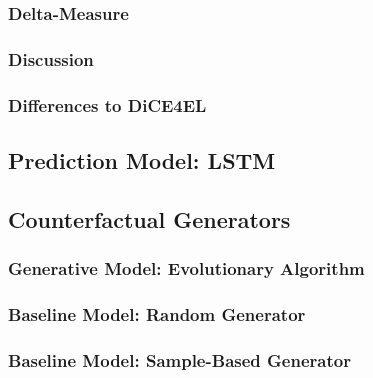 \documentclass[runningheads]{llncs}
\begin{document}
\subsubsection{Delta-Measure}
\label{sec:delta}


\subsubsection{Discussion}


\subsubsection{Differences to DiCE4EL}

 


\subsection{Prediction Model: LSTM}
\label{sec:model_prediction}



% 

\subsection{Counterfactual Generators}
\label{sec:model_generation}
\subsubsection{Generative Model: Evolutionary Algorithm}
\label{sec:model_evolutionary}


\subsubsection{Baseline Model: Random Generator}


\subsubsection{Baseline Model: Sample-Based Generator}

\end{document}
